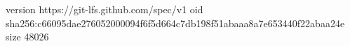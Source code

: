 version https://git-lfs.github.com/spec/v1
oid sha256:c66095dae276052000094f6f5d664c7db198f51abaaa8a7e653440f22abaa24e
size 48026

